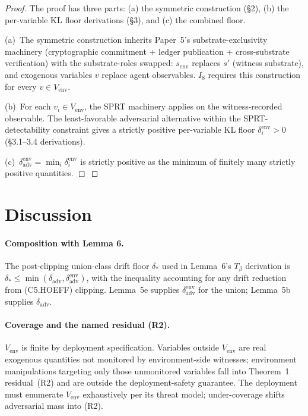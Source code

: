 \documentclass{article}
\newcommand{\deltaadv}{\delta_{\mathrm{adv}}}
\newcommand{\deltastar}{\delta_{*}}
\newcommand{\Tbeta}{T_{\beta}}
\begin{document}
\begin{proof}
The proof has three parts: (a) the symmetric construction (§2),
(b) the per-variable KL floor derivations (§3), and (c) the
combined floor.

(a)~The symmetric construction inherits Paper~5's
substrate-exclusivity machinery (cryptographic commitment +
ledger publication + cross-substrate verification) with the
substrate-roles swapped: $s_{\mathrm{env}}$ replaces $s'$
(witness substrate), and exogenous variables $v$ replace agent
observables.  $I_8$ requires this construction for every $v \in
V_{\mathrm{env}}$.

(b)~For each $v_i \in V_{\mathrm{env}}$, the SPRT machinery applies
on the witness-recorded observable.  The least-favorable
adversarial alternative within the SPRT-detectability constraint
gives a strictly positive per-variable KL floor
$\delta_i^{\mathrm{env}} > 0$ (§3.1--3.4 derivations).

(c)~$\deltaadv^{\mathrm{env}} = \min_i \delta_i^{\mathrm{env}}$ is
strictly positive as the minimum of finitely many strictly
positive quantities.  $\Box$
\end{proof}

\section{Discussion}

\paragraph{Composition with Lemma 6.}  The post-clipping union-class
drift floor $\deltastar$ used in Lemma~6's $\Tbeta$ derivation is
$\deltastar \leq \min(\deltaadv, \deltaadv^{\mathrm{env}})$, with
the inequality accounting for any drift reduction from (C5.HOEFF)
clipping.  Lemma~5e supplies $\deltaadv^{\mathrm{env}}$ for the
union; Lemma~5b supplies $\deltaadv$.

\paragraph{Coverage and the named residual (R2).}
$V_{\mathrm{env}}$ is finite by deployment specification.  Variables
outside $V_{\mathrm{env}}$ are real exogenous quantities not
monitored by environment-side witnesses; environment manipulations
targeting only those unmonitored variables fall into Theorem~1
residual~(R2) and are outside the deployment-safety guarantee.
The deployment must enumerate $V_{\mathrm{env}}$ exhaustively per
its threat model; under-coverage shifts adversarial mass into
(R2).
\end{document}
